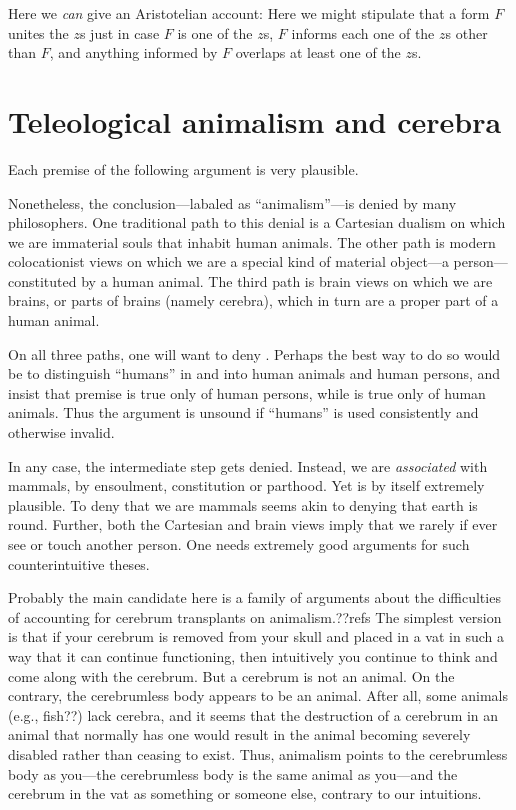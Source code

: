 Here we \textit{can} give an Aristotelian account:
Here we might stipulate that a form $F$ unites the $z$s just in case $F$ is one of 
the $z$s, $F$ informs each one of the $z$s other than $F$, and anything informed 
by $F$ overlaps at least one of the $z$s.

\section{Teleological animalism and cerebra}
Each premise of the following argument is very plausible.

Nonetheless, the conclusion---labaled as ``animalism''---is denied by many philosophers. One traditional path to 
this denial is a Cartesian dualism on which we are immaterial souls that inhabit human animals. The other path 
is modern colocationist views on which we are a special kind of material object---a person---constituted by a human 
animal. The third path is brain views on which we are brains, or parts of brains (namely cerebra), which in turn are a 
proper part of a human animal. 

On all three paths, one will want to deny . Perhaps the best way to do so would be to distinguish ``humans'' 
in  and  into  human animals and human persons, and insist that premise  is true 
only of human persons, while  is true only of human animals. Thus the argument is unsound if ``humans'' is used 
consistently and otherwise invalid. 

In any case, the intermediate step  gets denied. Instead, we are 
\textit{associated} with mammals, by ensoulment, constitution or parthood.   Yet  is by itself extremely plausible. 
To deny that we are mammals seems akin to denying that earth
is round. Further, both the Cartesian and brain views imply that we
rarely if ever see or touch another person. One needs extremely good arguments for such counterintuitive theses. 

Probably the main candidate here is a family of arguments about the difficulties of accounting for cerebrum transplants
on animalism.??refs The simplest version is that if your cerebrum is removed from your skull and placed in a vat in such a way
that it can continue functioning, then intuitively you continue to think and come along with the cerebrum. But a cerebrum
is not an animal. On the contrary, the cerebrumless body appears to be an animal. After all, some animals (e.g., fish??) lack
cerebra, and it seems that the destruction of a cerebrum in an animal that normally has one would result in the animal 
becoming severely disabled rather than ceasing to exist. Thus, animalism points to the cerebrumless body as you---the cerebrumless
body is the same animal as you---and the cerebrum in the vat as something  or someone else, contrary to our intuitions.


